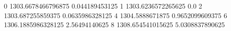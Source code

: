 0 1303.6678466796875 0.044189453125
1 1303.6236572265625 0.0
2 1303.687255859375 0.0635986328125
4 1304.5888671875 0.9652099609375
6 1306.1885986328125 2.56494140625
8 1308.654541015625 5.0308837890625

